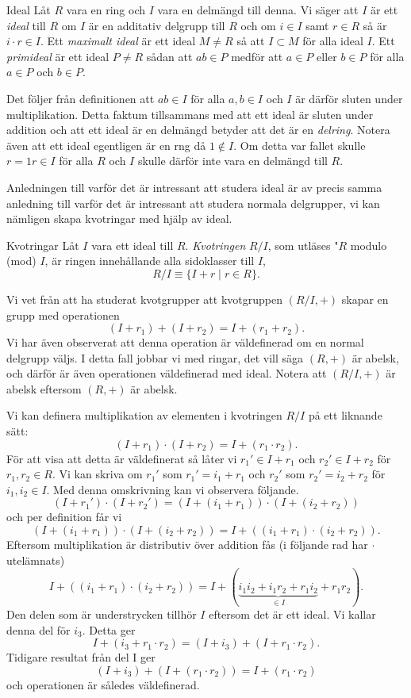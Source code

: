 \documentclass{article}
\theoremstyle{definition}
\begin{document}
\begin{mydef}{Ideal}{}
  Låt $R$ vara en ring och $I$ vara en delmängd till denna. Vi säger att $I$ är ett \textit{ideal} till $R$ om $I$ är en additativ delgrupp till $R$
  och om $i \in I$ samt $r \in R$ så är $i \cdot r \in I$. Ett \textit{maximalt ideal} är ett ideal $M \neq R$ så att $I \subset M$ för alla 
  ideal $I$. Ett \textit{primideal} är ett ideal $P \neq R$ sådan att $ab \in P$ medför att $a \in P$ eller $b \in P$ för alla $a \in P$ och $b \in P$.
\end{mydef}
Det följer från definitionen att $ab \in I$ för alla $a, b \in I$ och $I$ är därför sluten under multiplikation. Detta faktum tillsammans 
med att ett ideal är sluten under addition och att ett ideal är en delmängd betyder att det är en \textit{delring}.
Notera även att ett ideal egentligen är en rng då $1 \notin I$. Om detta var fallet skulle 
$r = 1r \in I$ för alla $R$ och $I$ skulle därför inte vara en delmängd till $R$. 

Anledningen till varför det är intressant att studera ideal är av precis samma anledning till varför det är intressant att studera normala delgrupper, 
vi kan nämligen skapa kvotringar med hjälp av ideal.

\begin{mydef}{Kvotringar}{}
  Låt $I$ vara ett ideal till $R$. \textit{Kvotringen} $R/I$, som utläses "$R$ modulo (mod) $I$, är ringen innehållande alla sidoklasser till $I$, 
  \[R/I \equiv \{I + r \; | \; r \in R\}.\]
\end{mydef}

Vi vet från att ha studerat kvotgrupper att kvotgruppen $(R/I, +)$ skapar en grupp med operationen 
\[ (I + r_1) + (I + r_2) = I + (r_1 + r_2).\]
Vi har även observerat att denna operation är väldefinerad om en normal delgrupp väljs. I detta fall jobbar vi med ringar, det vill säga 
$(R, +)$ är abelsk, och därför är även operationen väldefinerad med ideal. Notera att $(R/I, +)$ är abelsk eftersom $(R, +)$ är abelsk.

Vi kan definera multiplikation av elementen i kvotringen $R/I$ på ett liknande sätt:
\[(I + r_1) \cdot (I + r_2) = I + (r_1 \cdot r_2). \]
För att visa att detta är väldefinerat så låter vi $r_1' \in I + r_1$ och $r_2' \in I + r_2$ för $r_1, r_2 \in R$. Vi kan skriva 
om $r_1'$ som $r_1' = i_1 + r_1$ och $r_2'$ som $r_2' = i_2 + r_2$ för $i_1, i_2 \in I$. Med denna omskrivning kan vi observera följande.
\[(I + r_1') \cdot (I + r_2') = (I + (i_1 + r_1)) \cdot (I + (i_2 + r_2))\]
och per definition får vi 
\[(I + (i_1 + r_1)) \cdot (I + (i_2 + r_2)) = I + ((i_1 + r_1) \cdot (i_2 + r_2)).\]
Eftersom multiplikation är distributiv över addition fås (i följande rad har $\cdot$ utelämnats)
\[I + ((i_1 + r_1) \cdot (i_2 + r_2)) = I + (\underbrace{i_1  i_2 + i_1  r_2 + r_1  i_2}_{\in I} + r_1  r_2).\]
Den delen som är understrycken tillhör $I$ eftersom det är ett ideal. Vi kallar denna del för $i_3$. Detta ger
\[I + (i_3 + r_1 \cdot r_2) = (I + i_3) + (I + r_1 \cdot r_2).\]
Tidigare resultat från del I ger 
\[(I + i_3) + (I + (r_1 \cdot r_2)) = I + (r_1 \cdot r_2)\]
och operationen är således väldefinerad. 
\end{document}
